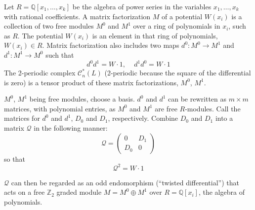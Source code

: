 \documentclass[a4paper,titlepage,twoside]{book}
\begin{document}
Let $R = \mathbb{Q}{ [x_1 , \dots , x_k ]}$ be the algebra of power series in the variables $x_1, \dots , x_k$ with rational coefficients.  A matrix factorization $M$ of a potential $W(x_i)$ is a collection of two free modules $M^0$ and $M^1$ over a ring of polynomials in $x_i$, such as $R$.  The potential $W(x_i)$ is an element in that ring of polynomials, $W(x_i) \in R$.  Matrix factorization also includes two maps $d^0 : M^0 \to M^1$ and $d^1:M^1 \to M^0$ such that 
\begin{equation}
  d^0 d^1 = W \cdot 1, \quad \, d^1 d^0 = W\cdot 1
\end{equation}
The 2-periodic complex $\mathcal{C}^*_n{(L)}$ (2-periodic because the square of the differential is zero) is a tensor product of these matrix factorizations, $M^0$, $M^1$.  

$M^0$, $M^1$ being free modules, choose a basis.  $d^0$ and $d^1$ can be rewritten as $m\times m$ matrices, with polynomial entries, as $M^0$ and $M^1$ are free $R$-modules.  Call the matrices for $d^0$ and $d^1$, $D_0$ and $D_1$, respectively.  Combine $D_0$ and $D_1$ into a matrix $\mathcal{Q}$ in the following manner:
\begin{equation}
  \mathcal{Q} = \left( \begin{matrix} 0 & D_1 \\
    D_0 & 0 \end{matrix} \right)
\end{equation}
so that  
\begin{equation}
\mathcal{Q}^2 = W\cdot 1
\end{equation}

$\mathcal{Q}$ can then be regarded as an odd endomorphism (``twisted differential'') that acts on a free $\mathbb{Z}_2$ graded module $M = M^0 \oplus M^1$ over $R = \mathbb{Q}[x_i]$, the algebra of polynomials.  
\end{document}
